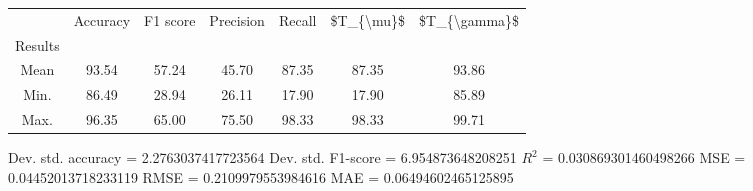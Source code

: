 \begin{tabular}{|c|c|c|c|c|c|c|}
\toprule
{} &  Accuracy &  F1 score &  Precision &  Recall &  \$T\_\{\textbackslash mu\}\$ &  \$T\_\{\textbackslash gamma\}\$ \\
Results &           &           &            &         &            &               \\
\hline
Mean    &     93.54 &     57.24 &      45.70 &   87.35 &      87.35 &         93.86 \\
Min.    &     86.49 &     28.94 &      26.11 &   17.90 &      17.90 &         85.89 \\
Max.    &     96.35 &     65.00 &      75.50 &   98.33 &      98.33 &         99.71 \\
\bottomrule
\end{tabular}

 Dev. std. accuracy = 2.2763037417723564
 Dev. std. F1-score = 6.954873648208251
 $R^2$ = 0.030869301460498266
 MSE = 0.04452013718233119
 RMSE = 0.2109979553984616
 MAE = 0.06494602465125895